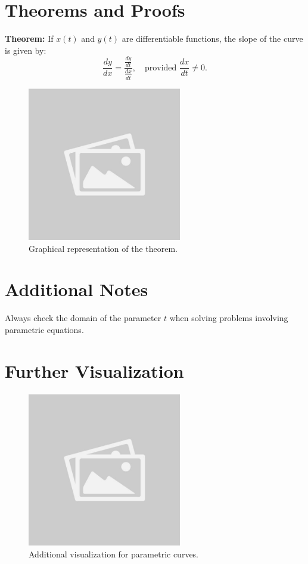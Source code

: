 \documentclass{article}
\begin{document}
\section*{Theorems and Proofs}
\begin{theorembox}
\textbf{Theorem:} If $x(t)$ and $y(t)$ are differentiable functions, the slope of the curve is given by:
\[ \frac{dy}{dx} = \frac{\frac{dy}{dt}}{\frac{dx}{dt}}, \quad \text{provided } \frac{dx}{dt} \neq 0. \]
\end{theorembox}

\begin{figure}[H]
    \centering
    \includegraphics[width=0.6\textwidth]{sample_image1.jpg}
    \caption{Graphical representation of the theorem.}
    \label{fig:sample_image1}
\end{figure}

\section*{Additional Notes}
\begin{notebox}
Always check the domain of the parameter $t$ when solving problems involving parametric equations.
\end{notebox}

\section*{Further Visualization}
\begin{figure}[H]
    \centering
    \includegraphics[width=0.6\textwidth]{sample_image2.jpg}
    \caption{Additional visualization for parametric curves.}
    \label{fig:sample_image2}
\end{figure}
\end{document}
